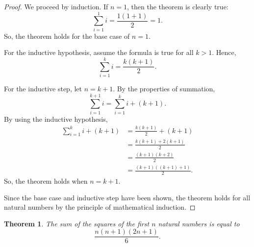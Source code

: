 \documentclass[headings=standardclasses]{scrartcl}
\newtheorem{theorem}{Theorem}
\theoremstyle{definition}
\begin{document}
\begin{proof}
  We proceed by induction. If \(n = 1\), then the theorem is clearly true:
  \begin{equation*}
    ∑_{i = 1}^1 i = \frac{1(1 + 1)}{2} = 1.
  \end{equation*}
  So, the theorem holds for the base case of \(n = 1\).

  For the inductive hypothesis, assume the formula is true for all \(k > 1\).
  Hence,
  \begin{equation*}
    ∑_{i = 1}^k i = \frac{k(k + 1)}{2}.
  \end{equation*}

  For the inductive step, let \(n = k + 1\). By the properties of summation,
  \begin{equation*}
    ∑_{i = 1}^{k + 1} i = \sum_{i = 1}^{k} i + (k + 1).
  \end{equation*}
  By using the inductive hypothesis,
  \begin{equation*}
  \begin{split}
    ∑_{i = 1}^{k} i + (k + 1) &= \frac{k(k + 1)}{2} + (k + 1) \\
                              &= \frac{k(k + 1) + 2(k + 1)}{2} \\
                              &= \frac{(k + 1)(k + 2)}{2} \\
                              &= \frac{(k + 1)((k + 1) + 1)}{2}.
  \end{split}
  \end{equation*}
  So, the theorem holds when \(n = k + 1\).

  Since the base case and inductive step have been shown, the theorem holds for
  all natural numbers by the principle of mathematical induction.
\end{proof}

\begin{theorem}
  The sum of the squares of the first \(n\) natural numbers is equal to
  \[ \frac{n(n + 1)(2n + 1)}{6}. \]
\end{theorem}
\end{document}
